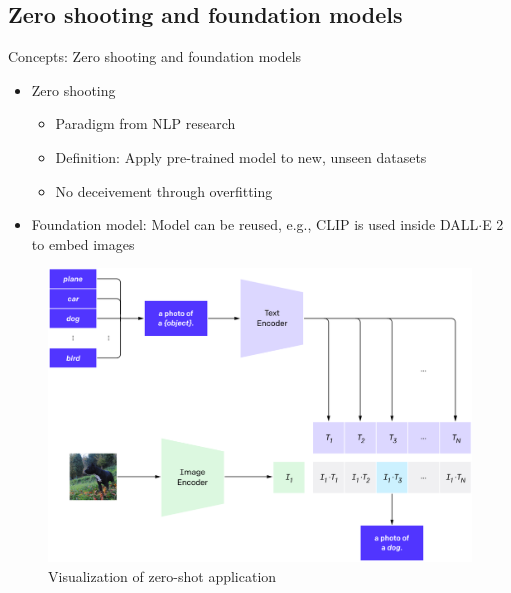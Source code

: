 \documentclass[xcolor=dvipsnames]{beamer}
\begin{document}
\subsection{Zero shooting and foundation models} %
\begin{frame}{Concepts: Zero shooting and foundation models}
  \begin{itemize}
    \item Zero shooting
    \begin{itemize}
      \item Paradigm from NLP research
      \item Definition: Apply pre-trained model to new, unseen datasets
      \item No deceivement through overfitting
    \end{itemize}
    \item Foundation model: Model can be reused, e.g., CLIP is used inside DALL$\cdot$E 2 \parencite{ramesh2022hierarchical} to embed images
  \end{itemize}

  \begin{figure}[ht]
    \begin{minipage}{0.67\textwidth}
      \centering
      \includegraphics[width=0.9\linewidth]{../../figures/02-04-text-support-img/zero-shooting}
    \end{minipage}
    \begin{minipage}[c]{0.3\textwidth}
      \caption{Visualization of zero-shot application \parencite{radford2021learning}}
    \end{minipage}
  \end{figure}
\end{frame}
\end{document}
